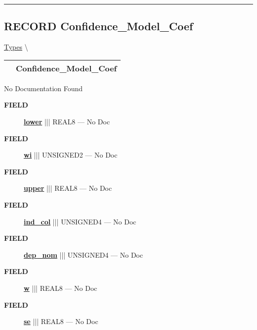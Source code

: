\rule{\linewidth}{0.5pt}
\subsection*{\textsf{\colorbox{headtoc}{\color{white} RECORD}
Confidence\_Model\_Coef}}

\hypertarget{ecldoc:logisticregression.types.confidence_model_coef}{}
\hspace{0pt} \hyperlink{ecldoc:LogisticRegression.Types}{Types} \textbackslash 

{\renewcommand{\arraystretch}{1.5}
\begin{tabularx}{\textwidth}{|>{\raggedright\arraybackslash}l|X|}
\hline
\hspace{0pt}\mytexttt{\color{red} } & \textbf{Confidence\_Model\_Coef} \\
\hline
\end{tabularx}
}

\par





No Documentation Found







\par
\begin{description}
\item [\colorbox{tagtype}{\color{white} \textbf{\textsf{FIELD}}}] \textbf{\underline{lower}} ||| REAL8 --- No Doc
\item [\colorbox{tagtype}{\color{white} \textbf{\textsf{FIELD}}}] \textbf{\underline{wi}} ||| UNSIGNED2 --- No Doc
\item [\colorbox{tagtype}{\color{white} \textbf{\textsf{FIELD}}}] \textbf{\underline{upper}} ||| REAL8 --- No Doc
\item [\colorbox{tagtype}{\color{white} \textbf{\textsf{FIELD}}}] \textbf{\underline{ind\_col}} ||| UNSIGNED4 --- No Doc
\item [\colorbox{tagtype}{\color{white} \textbf{\textsf{FIELD}}}] \textbf{\underline{dep\_nom}} ||| UNSIGNED4 --- No Doc
\item [\colorbox{tagtype}{\color{white} \textbf{\textsf{FIELD}}}] \textbf{\underline{w}} ||| REAL8 --- No Doc
\item [\colorbox{tagtype}{\color{white} \textbf{\textsf{FIELD}}}] \textbf{\underline{se}} ||| REAL8 --- No Doc
\end{description}





